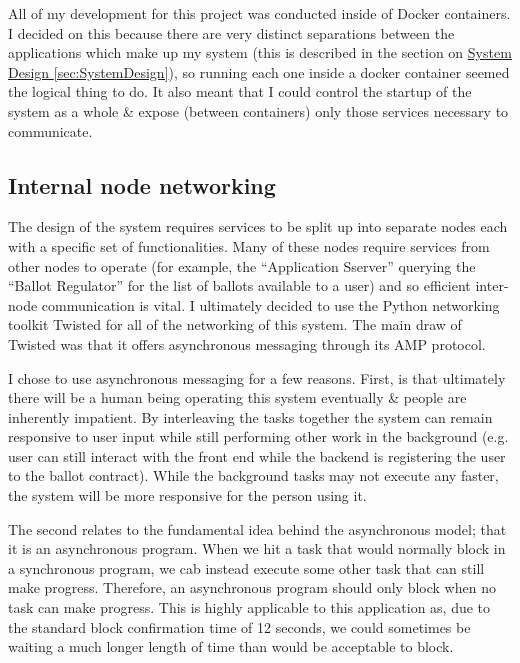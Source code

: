\documentclass{article}
\begin{document}
All of my development for this project was conducted inside of Docker containers. I decided on this because there are very distinct separations between the applications which make up my system (this is described in the section on \hyperref[sec:SystemDesign]{System Design \ref*{sec:SystemDesign}}), so running each one inside a docker container seemed the logical thing to do. It also meant that I could control the startup of the system as a whole \& expose (between containers) only those services necessary to communicate.

\cleardoublepage    
\subsection{Internal node networking}
\label{sec:InternalNodeNetworking}
The design of the system requires services to be split up into separate nodes each with a specific set of functionalities. Many of these nodes require services from other nodes to operate (for example, the ``Application Sserver'' querying the ``Ballot Regulator'' for the list of ballots available to a user) and so efficient inter-node communication is vital. I ultimately decided to use the Python networking toolkit Twisted \citep{63_twisted_2017} for all of the networking of this system. The main draw of Twisted was that it offers asynchronous messaging through its AMP protocol.


I chose to use asynchronous messaging for a few reasons. First, is that ultimately there will be a human being operating this system eventually \& people are inherently impatient. By interleaving the tasks together the system can remain responsive to user input while still performing other work in the background (e.g. user can still interact with the front end while the backend is registering the user to the ballot contract). While the background tasks may not execute any faster, the system will be more responsive for the person using it.

The second relates to the fundamental idea behind the asynchronous model; that it is an asynchronous program. When we hit a task that would normally block in a synchronous program, we cab instead execute some other task that can still make progress. Therefore, an asynchronous program should only block when no task can make progress. This is highly applicable to this application as, due to the standard block confirmation time of 12 seconds, we could sometimes be waiting a much longer length of time than would be acceptable to block.
\end{document}
